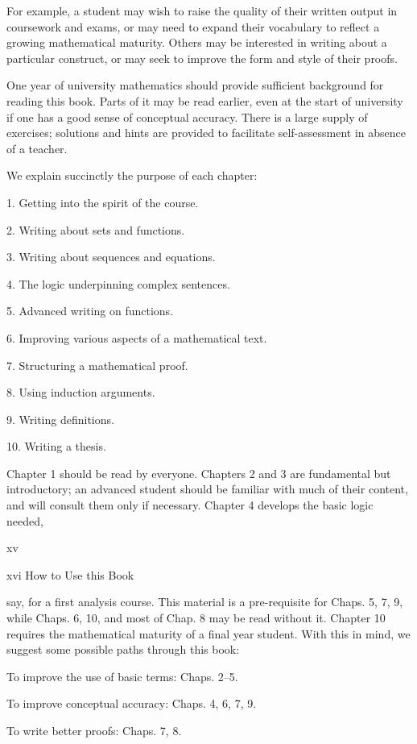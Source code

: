 \documentclass[11pt]{article}
\theoremstyle{plain}
\theoremstyle{definition}
\begin{document}
For example, a student may wish to raise the quality of their written output in coursework and exams, or may need to expand their vocabulary to reflect a growing mathematical maturity. Others may be interested in writing about a particular construct, or may seek to improve the form and style of their proofs.

One year of university mathematics should provide sufficient background for reading this book. Parts of it may be read earlier, even at the start of university if one has a good sense of conceptual accuracy. There is a large supply of exercises; solutions and hints are provided to facilitate self-assessment in absence of a teacher.

We explain succinctly the purpose of each chapter:

1. Getting into the spirit of the course.

2. Writing about sets and functions.

3. Writing about sequences and equations.

4. The logic underpinning complex sentences.

5. Advanced writing on functions.

6. Improving various aspects of a mathematical text.

7. Structuring a mathematical proof.

8. Using induction arguments.

9. Writing definitions.

10. Writing a thesis.

Chapter 1 should be read by everyone. Chapters 2 and 3 are fundamental but introductory; an advanced student should be familiar with much of their content, and will consult them only if necessary. Chapter 4 develops the basic logic needed,

xv

xvi How to Use this Book

say, for a first analysis course. This material is a pre-requisite for Chaps. 5, 7, 9, while Chaps. 6, 10, and most of Chap. 8 may be read without it. Chapter 10 requires the mathematical maturity of a final year student. With this in mind, we suggest some possible paths through this book:

\textbullet{} To improve the use of basic terms: Chaps. 2--5.

\textbullet{} To improve conceptual accuracy: Chaps. 4, 6, 7, 9.

\textbullet{} To write better proofs: Chaps. 7, 8.
\end{document}
